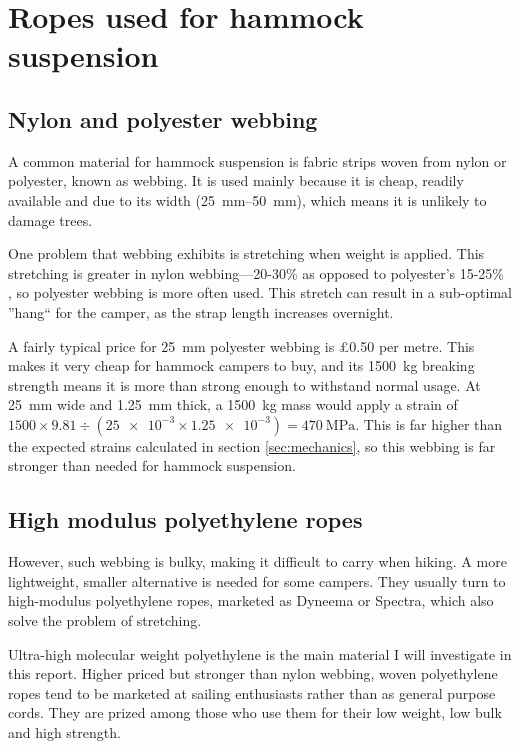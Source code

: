\section{Ropes used for hammock suspension}
\subsection{Nylon and polyester webbing}
A common material for hammock suspension is fabric strips woven from nylon or polyester, known as webbing. It is used mainly because it is cheap, readily available and due to its width (\SIrange{25}{50}{\milli\metre}), which means it is unlikely to damage trees.

One problem that webbing exhibits is stretching when weight is applied. This stretching is greater in nylon webbing---20-30\% as opposed to polyester's 15-25\% , so polyester webbing is more often used. This stretch can result in a sub-optimal ''hang`` for the camper, as the strap length increases overnight.

A fairly typical price for \SI{25}{\milli\metre} polyester webbing is £0.50 per metre. This makes it very cheap for hammock campers to buy, and its \SI{1500}{\kilo\gram} breaking strength  means it is more than strong enough to withstand normal usage. At \SI{25}{\milli\metre} wide and \SI{1.25}{\milli\metre} thick, a \SI{1500}{\kilo\gram} mass would apply a strain of $1500 \times 9.81 \div (\num{25e-3} \times \num{1.25e-3}) = \SI{470}{\mega\pascal}$. This is far higher than the expected strains calculated in section \ref{sec:mechanics}, so this webbing is far stronger than needed for hammock suspension.

\subsection{High modulus polyethylene ropes}
However, such webbing is bulky, making it difficult to carry when hiking. A more lightweight, smaller alternative is needed for some campers. They usually turn to high-modulus polyethylene ropes, marketed as Dyneema or Spectra, which also solve the problem of stretching.

Ultra-high molecular weight polyethylene is the main material I will investigate in this report. Higher priced but stronger than nylon webbing, woven polyethylene ropes tend to be marketed at sailing enthusiasts rather than as general purpose cords. They are prized among those who use them for their low weight, low bulk and high strength.
